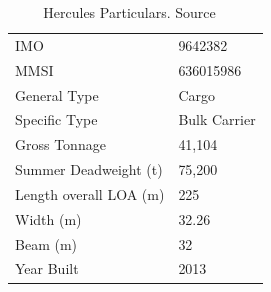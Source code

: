 \begin{table}[h!]
    \centering
    \caption[Hercules Particulars]{Hercules Particulars. Source ~\citep{marinetraffic}}
    \label{tab:hercules_particulars}
    \begin{tabular}{ll}
    \hline
    IMO                    & 9642382      \\
    MMSI                   & 636015986    \\
    General Type           & Cargo        \\
    Specific Type          & Bulk Carrier \\
    Gross Tonnage          & 41,104       \\
    Summer Deadweight (t)  & 75,200       \\
    Length overall LOA (m) & 225          \\
    Width (m)              & 32.26        \\
    Beam (m)               & 32           \\
    Year Built             & 2013        
    \end{tabular}
\end{table}